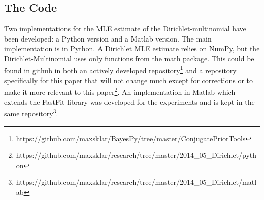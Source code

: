\documentclass[twoside]{article}
\begin{document}
\subsection{The Code}
\label{code}

Two implementations for the MLE estimate of the Dirichlet-multinomial have been developed: a Python version and a Matlab version.  The main implementation is in Python.  A Dirichlet MLE estimate relies on NumPy, but the Dirichlet-Multinomial uses only functions from the math package. This could be found in github in both an actively developed repository\footnote{https://github.com/maxsklar/BayesPy/tree/master/ConjugatePriorTools} and a repository specifically for this paper that will not change much except for corrections or to make it more relevant to this paper\footnote{https://github.com/maxsklar/research/tree/master/2014\_05\_Dirichlet/python}. An implementation in Matlab which extends the FastFit library was developed for the experiments and is kept in the same repository\footnote{https://github.com/maxsklar/research/tree/master/2014\_05\_Dirichlet/matlab}.

\end{document}
